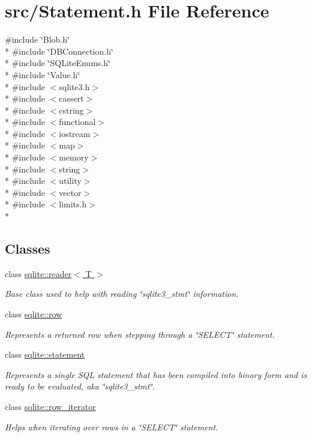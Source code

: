 \hypertarget{a00032}{\section{src/\-Statement.h File Reference}
\label{a00032}
}
{\ttfamily \#include \char`\"{}Blob.\-h\char`\"{}}\\*
{\ttfamily \#include \char`\"{}D\-B\-Connection.\-h\char`\"{}}\\*
{\ttfamily \#include \char`\"{}S\-Q\-Lite\-Enums.\-h\char`\"{}}\\*
{\ttfamily \#include \char`\"{}Value.\-h\char`\"{}}\\*
{\ttfamily \#include $<$sqlite3.\-h$>$}\\*
{\ttfamily \#include $<$cassert$>$}\\*
{\ttfamily \#include $<$cstring$>$}\\*
{\ttfamily \#include $<$functional$>$}\\*
{\ttfamily \#include $<$iostream$>$}\\*
{\ttfamily \#include $<$map$>$}\\*
{\ttfamily \#include $<$memory$>$}\\*
{\ttfamily \#include $<$string$>$}\\*
{\ttfamily \#include $<$utility$>$}\\*
{\ttfamily \#include $<$vector$>$}\\*
{\ttfamily \#include $<$limits.\-h$>$}\\*
\subsection*{Classes}
\begin{DoxyCompactItemize}
\item 
class \hyperlink{a00010}{sqlite\-::reader$<$ T $>$}
\begin{DoxyCompactList}\small\item\em Base class used to help with reading \char`\"{}sqlite3\-\_\-stmt\char`\"{} information. \end{DoxyCompactList}\item 
class \hyperlink{a00011}{sqlite\-::row}
\begin{DoxyCompactList}\small\item\em Represents a returned row when stepping through a \char`\"{}\-S\-E\-L\-E\-C\-T\char`\"{} statement. \end{DoxyCompactList}\item 
class \hyperlink{a00013}{sqlite\-::statement}
\begin{DoxyCompactList}\small\item\em Represents a single S\-Q\-L statement that has been compiled into binary form and is ready to be evaluated, aka \char`\"{}sqlite3\-\_\-stmt\char`\"{}. \end{DoxyCompactList}\item 
class \hyperlink{a00012}{sqlite\-::row\-\_\-iterator}
\begin{DoxyCompactList}\small\item\em Helps when iterating over rows in a \char`\"{}\-S\-E\-L\-E\-C\-T\char`\"{} statement. \end{DoxyCompactList}\end{DoxyCompactItemize}
